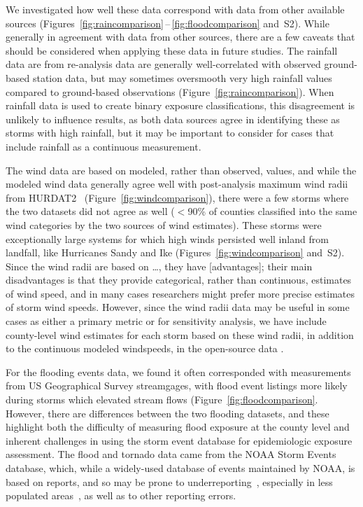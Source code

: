 We investigated how well these data correspond with data from other available
sources (Figures~\ref{fig:raincomparison}\,--\,\ref{fig:floodcomparison}
and~S2). While generally in agreement with data from other sources,
there are a few caveats that should be considered when applying these data in
future studies. The rainfall data are from re-analysis data are generally
well-correlated with observed ground-based station data, but may sometimes
oversmooth very high rainfall values compared to ground-based observations
(Figure~\ref{fig:raincomparison}). When rainfall data is used to create binary
exposure classifications, this disagreement is unlikely to influence results,
as both data sources agree in identifying these as storms with high rainfall,
but it may be important to consider for cases that include rainfall as a
continuous measurement. 

The wind data are based on modeled, rather than observed, values, and while the
modeled wind data generally agree well with post-analysis maximum wind radii
from \ac{HURDAT2}~\parencite{landsea2013} (Figure~\ref{fig:windcomparison}),
there were a few storms where the two datasets did not agree as well ($<$90\%
of counties classified into the same wind categories by the two sources of wind
estimates). These storms were exceptionally large systems for which high winds
persisted well inland from landfall, like Hurricanes Sandy and Ike
(Figures~\ref{fig:windcomparison} and~S2). Since the wind radii are based on
\ldots, they have [advantages]; their main disadvantages is that they provide
categorical, rather than continuous, estimates of wind speed, and in many cases
researchers might prefer more precise estimates of storm wind speeds. However,
since the wind radii data may be useful in some cases as either a primary
metric or for sensitivity analysis, we have include county-level wind estimates
for each storm based on these wind radii, in addition to the continuous modeled
windspeeds, in the open-source data \parencite{hurricaneexposuredata}.

For the flooding events data, we found it often corresponded with measurements
from \ac{US} Geographical Survey streamgages, with flood event listings more
likely during storms which elevated stream flows
(Figure~\ref{fig:floodcomparison}. However, there are differences between the
two flooding datasets, and these highlight both the difficulty of measuring
flood exposure at the county level and inherent challenges in using the storm
event database for epidemiologic exposure assessment.  The flood and tornado
data came from the \ac{NOAA} Storm Events database, which, while a widely-used
database of events maintained by \ac{NOAA}, is based on reports, and so may be
prone to underreporting~\parencite{Ashley2008flood, Curran2000}, especially in
less populated areas~\parencite{Witt1998, Ashley2007}, as well as to other
reporting errors. 

